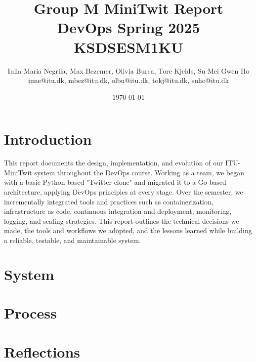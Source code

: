 \documentclass[10pt,a4paper]{article}
\title{Group M MiniTwit Report \\ DevOps Spring 2025 KSDSESM1KU}
\author{Iulia Maria Negrila, Max Bezemer, Olivia Burca, Tore Kjelds, Su Mei Gwen Ho \\ iune@itu.dk, mbez@itu.dk, olbu@itu.dk, tokj@itu.dk, suho@itu.dk}
\date{\today}
\begin{document}
\maketitle
\tableofcontents
\newpage
\section{Introduction}
This report documents the design, implementation, and evolution of our ITU-MiniTwit system throughout the DevOps course. Working as a team, we began with a basic Python-based "Twitter clone" and migrated it to a Go-based architecture, applying DevOps principles at every stage. Over the semester, we incrementally integrated tools and practices such as containerization, infrastructure as code, continuous integration and deployment, monitoring, logging, and scaling strategies. This report outlines the technical decisions we made, the tools and workflows we adopted, and the lessons learned while building a reliable, testable, and maintainable system.

\section{System}


\section{Process}


\section{Reflections}

\printbibliography

\end{document}
